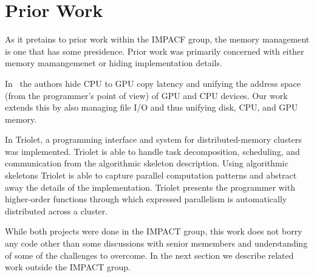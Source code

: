 \section{Prior Work}

As it pretains to prior work within the IMPACF group,
	the memory management is one that has some presidence.
Prior work was primarily concerned with either memory mamangemenet
	or hiding implementation details.

In~\cite{gmac} the authors hide CPU
	to GPU copy latency and unifying the 
	address space (from the programmer's point of view)
	of GPU and CPU devices.
Our work extends this by also managing file I/O and thus
	unifying disk, CPU, and GPU memory.

In Triolet\cite{rodrigues2014triolet}, a programming interface and system for
distributed-memory clusters was implemented. Triolet is able to handle
task decomposition, scheduling, and communication from the algorithmic skeleton description. Using algorithmic skeletons Triolet is able to capture parallel
computation patterns and abstract away the details of the implementation.
Triolet presents the programmer with higher-order functions through which
expressed parallelism is automatically distributed across a cluster.

While both projects were done in the IMPACT group, this work does
	not borry any code other than some discussions with senior memembers
	and understanding of some of the challenges to overcome.
In the next section we describe related work outside the IMPACT group.
